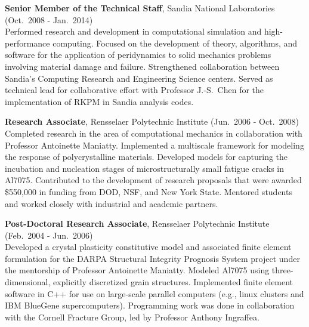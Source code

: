 \documentclass[11pt]{article}
\newlength{\minipagewidth} \setlength{\minipagewidth}{6.25in} %
\newlength{\myheadheight} \setlength{\myheadheight}{0.24in}
\newlength{\mytopmargin} \setlength{\mytopmargin}{-0.5in}
\begin{document}
\newpage
\pagestyle{fancy}
\cfoot{}
\setlength{\headheight}{\myheadheight}
\setlength{\topmargin}{\mytopmargin}


\begin{minipage}{\minipagewidth}
\textbf{Senior Member of the Technical Staff}, Sandia National Laboratories (Oct.~2008 - Jan.~2014) \\ 
%
Performed research and development in computational simulation and high-performance computing.  Focused on the development of theory, algorithms, and software for the application of peridynamics to solid mechanics problems involving material damage and failure.  Strengthened collaboration between Sandia's Computing Research and Engineering Science centers.  Served as technical lead for collaborative effort with Professor J.-S.~Chen for the implementation of RKPM in Sandia analysis codes.
\end{minipage}\vspace{\parskip}

\begin{minipage}{\minipagewidth}
\textbf{Research Associate}, Rensselaer Polytechnic Institute (Jun.~2006 - Oct.~2008) \\ 
%
Completed research in the area of computational mechanics in collaboration with Professor Antoinette Maniatty.  Implemented a multiscale framework for modeling the response of polycrystalline materials.  Developed models for capturing the incubation and nucleation stages of microstructurally small fatigue cracks in Al7075.  Contributed to the development of research proposals that were awarded \$550,000 in funding from DOD, NSF, and New York State.  Mentored students and worked closely with industrial and academic partners.
\end{minipage}\vspace{\parskip}

\begin{minipage}{\minipagewidth}
\textbf{Post-Doctoral Research Associate}, Rensselaer Polytechnic Institute (Feb.~2004 - Jun.~2006) \\ 
%
Developed a crystal plasticity constitutive model and associated finite element formulation for the DARPA Structural Integrity Prognosis System project under the mentorship of Professor Antoinette Maniatty.  Modeled Al7075 using three-dimensional, explicitly discretized grain structures.  Implemented finite element software in C++ for use on large-scale parallel computers (e.g., linux clusters and IBM BlueGene supercomputers).  Programming work was done in collaboration with the Cornell Fracture Group, led by Professor Anthony Ingraffea.
\end{minipage}\vspace{\parskip}
\end{document}
